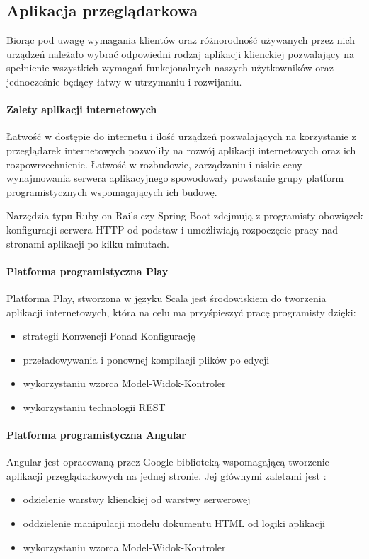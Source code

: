 \documentclass[a4paper,12pt,twoside]{article}
\begin{document}
\subsection{Aplikacja przeglądarkowa}
Biorąc pod uwagę wymagania klientów oraz różnorodność używanych przez nich urządzeń należało wybrać odpowiedni rodzaj aplikacji klienckiej pozwalający na spełnienie wszystkich wymagań funkcjonalnych naszych użytkowników 
oraz jednocześnie będący łatwy w utrzymaniu i rozwijaniu.

\paragraph{Zalety aplikacji internetowych}
Łatwość w dostępie do internetu i ilość urządzeń pozwalających na 
korzystanie z przeglądarek internetowych pozwoliły 
na rozwój aplikacji internetowych oraz ich rozpowrzechnienie.
Łatwość w rozbudowie, zarządzaniu i 
niskie ceny wynajmowania serwera aplikacyjnego spowodowały 
powstanie grupy platform programistycznych wspomagających ich budowę. 

Narzędzia typu Ruby on Rails czy Spring Boot 
zdejmują z programisty obowiązek konfiguracji serwera 
HTTP od podstaw i umożliwiają rozpoczęcie pracy  
nad stronami aplikacji po kilku minutach.

\paragraph{Platforma programistyczna Play}
Platforma Play, stworzona w języku Scala jest środowiskiem 
do tworzenia aplikacji internetowych, 
która na celu ma przyśpieszyć pracę programisty dzięki:
\begin{itemize}
\item strategii Konwencji Ponad Konfigurację
\item przeładowywania i ponownej kompilacji plików po edycji
\item wykorzystaniu wzorca Model-Widok-Kontroler
\item wykorzystaniu technologii REST
\end{itemize} 
  
\paragraph{Platforma programistyczna Angular}
Angular jest opracowaną przez Google biblioteką wspomagającą tworzenie 
aplikacji przeglądarkowych na jednej stronie. Jej głównymi zaletami jest :
\begin{itemize}
\item odzielenie warstwy klienckiej od warstwy serwerowej
\item oddzielenie manipulacji modelu dokumentu HTML od logiki aplikacji
\item wykorzystaniu wzorca Model-Widok-Kontroler
\end{itemize} 
    
\end{document}
